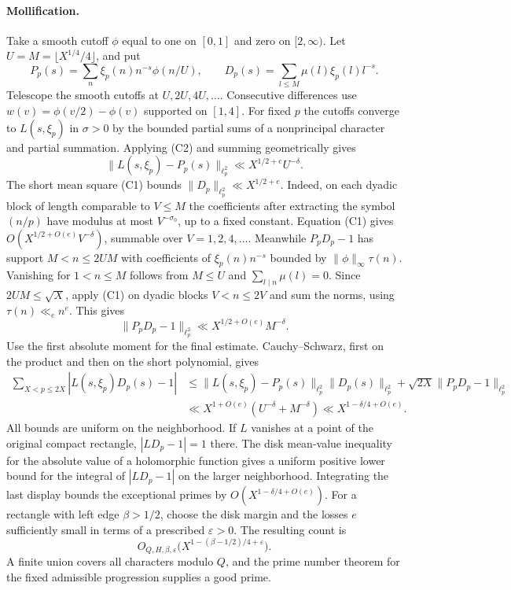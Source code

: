 \paragraph{Mollification.} Take a smooth cutoff $\phi$ equal to one on $[0,1]$ and zero on $[2,\infty)$. Let $U=M=\lfloor X^{1/4}/4\rfloor$, and put
\[
 P_p(s)=\sum_n\xi_p(n)n^{-s}\phi(n/U),\qquad
 D_p(s)=\sum_{l\le M}\mu(l)\xi_p(l)l^{-s}.
\]
Telescope the smooth cutoffs at $U,2U,4U,\ldots$. Consecutive differences use $w(v)=\phi(v/2)-\phi(v)$ supported on $[1,4]$. For fixed $p$ the cutoffs converge to $L(s,\xi_p)$ in $\sigma>0$ by the bounded partial sums of a nonprincipal character and partial summation. Applying (C2) and summing geometrically gives
\[
 \|L(s,\xi_p)-P_p(s)\|_{\ell_p^2}\ll X^{1/2+e}U^{-\delta}.
\]
The short mean square (C1) bounds $\|D_p\|_{\ell_p^2}\ll X^{1/2+e}$. Indeed, on each dyadic block of length comparable to $V\le M$ the coefficients after extracting the symbol $(n/p)$ have modulus at most $V^{-\sigma_0}$, up to a fixed constant. Equation (C1) gives $O(X^{1/2+O(e)}V^{-\delta})$, summable over $V=1,2,4,\ldots$. Meanwhile $P_pD_p-1$ has support $M<n\le 2UM$ with coefficients of $\xi_p(n)n^{-s}$ bounded by $\|\phi\|_\infty\tau(n)$. Vanishing for $1<n\le M$ follows from $M\le U$ and $\sum_{l\mid n}\mu(l)=0$. Since $2UM\le\sqrt X$, apply (C1) on dyadic blocks $V<n\le 2V$ and sum the norms, using $\tau(n)\ll_e n^e$. This gives
\[
 \|P_pD_p-1\|_{\ell_p^2}\ll X^{1/2+O(e)}M^{-\delta}.
\]
Use the first absolute moment for the final estimate. Cauchy--Schwarz, first on the product and then on the short polynomial, gives
\begin{align*}
 \sum_{X<p\le2X}|L(s,\xi_p)D_p(s)-1|
 &\le \|L(s,\xi_p)-P_p(s)\|_{\ell_p^2}\|D_p(s)\|_{\ell_p^2}
       +\sqrt{2X}\|P_pD_p-1\|_{\ell_p^2}\\
 &\ll X^{1+O(e)}(U^{-\delta}+M^{-\delta})
 \ll X^{1-\delta/4+O(e)} .
\end{align*}
All bounds are uniform on the neighborhood. If $L$ vanishes at a point of the original compact rectangle, $|LD_p-1|=1$ there. The disk mean-value inequality for the absolute value of a holomorphic function gives a uniform positive lower bound for the integral of $|LD_p-1|$ on the larger neighborhood. Integrating the last display bounds the exceptional primes by $O(X^{1-\delta/4+O(e)})$. For a rectangle with left edge $\beta>1/2$, choose the disk margin and the losses $e$ sufficiently small in terms of a prescribed $\varepsilon>0$. The resulting count is
\[
 O_{Q,H,\beta,\varepsilon}
 \bigl(X^{1-(\beta-1/2)/4+\varepsilon}\bigr).
\]
A finite union covers all characters modulo $Q$, and the prime number theorem for the fixed admissible progression supplies a good prime.
